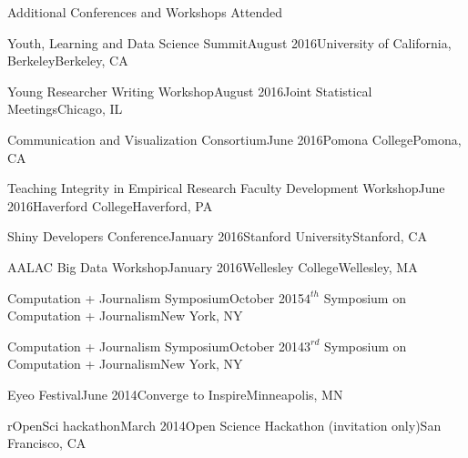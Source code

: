 \documentclass{resume} %
\begin{document}
\begin{rSection}{Additional Conferences and Workshops Attended}


\begin{sSubsection}{Youth, Learning and Data Science Summit}{}{August 2016}{University of California, Berkeley}{Berkeley, CA}
\end{sSubsection}


\begin{sSubsection}{Young Researcher Writing Workshop}{}{August 2016}{Joint Statistical Meetings}{Chicago, IL}
\end{sSubsection}


\begin{sSubsection}{Communication and Visualization Consortium}{}{June 2016}{Pomona College}{Pomona, CA}
\end{sSubsection}

\begin{sSubsection}{Teaching Integrity in Empirical Research Faculty Development Workshop}{}{June 2016}{Haverford College}{Haverford, PA}
\end{sSubsection}

\begin{sSubsection}{Shiny Developers Conference}{}{January 2016}{Stanford University}{Stanford, CA}
\end{sSubsection}

\begin{sSubsection}{AALAC Big Data Workshop}{}{January 2016}{Wellesley College}{Wellesley, MA}
\end{sSubsection}

\begin{sSubsection}{Computation + Journalism Symposium}{}{October 2015}{$4^{th}$ Symposium on Computation + Journalism}{New York, NY}
\end{sSubsection}

\begin{sSubsection}{Computation + Journalism Symposium}{}{October 2014}{$3^{rd}$ Symposium on Computation + Journalism}{New York, NY}
\end{sSubsection}

\begin{sSubsection}{Eyeo Festival}{}{June 2014}{Converge to Inspire}{Minneapolis, MN}
\end{sSubsection}

\begin{sSubsection}{rOpenSci hackathon}{}{March 2014}{Open Science Hackathon (invitation only)}{San Francisco, CA}
\end{sSubsection}


\end{rSection}
\end{document}

